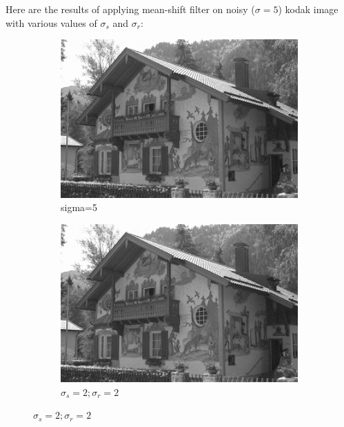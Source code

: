 \documentclass[12pt]{article}
\begin{document}
Here are the results of applying mean-shift filter on noisy ($\sigma = 5$) kodak image with various values of $\sigma_s$ and $\sigma_r$:

\begin{figure}[h]
    \centering
    \begin{subfigure}[b]{0.24\textwidth}
        \centering
        \includegraphics[width=\textwidth]{../images/noisy_kodak24.png}
        \caption{sigma=5}
        \label{Noisy }
    \end{subfigure}
    \begin{subfigure}[b]{0.24\textwidth}
        \centering
        \includegraphics[width=\textwidth]{../images/filtered_kodak24_meanshift_sigma_s_2_sigma_r_2.png}
        \caption{$\sigma_s=2;\sigma_r=2$}
        \label{fig:subfig2}
    \end{subfigure}

\end{figure}
\end{document}
